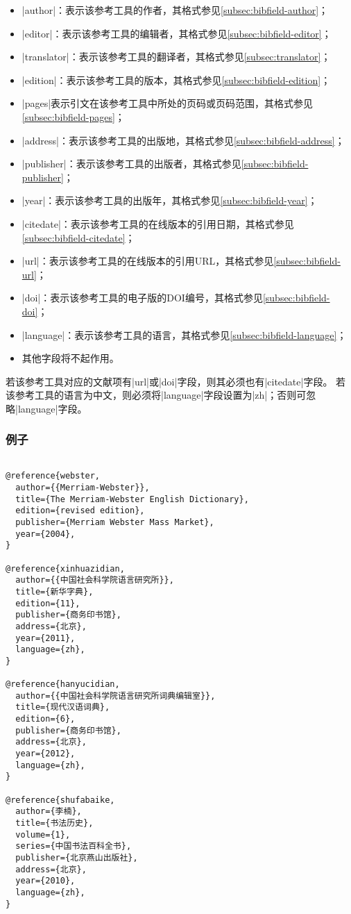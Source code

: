 \begin{itemize}
\item |author|：表示该参考工具的作者，其格式参见\ref{subsec:bibfield-author}；
\item |editor|：表示该参考工具的编辑者，其格式参见\ref{subsec:bibfield-editor}；
\item |translator|：表示该参考工具的翻译者，其格式参见\ref{subsec:translator}；
\item |edition|：表示该参考工具的版本，其格式参见\ref{subsec:bibfield-edition}；
\item |pages|表示引文在该参考工具中所处的页码或页码范围，其格式参见\ref{subsec:bibfield-pages}；
\item |address|：表示该参考工具的出版地，其格式参见\ref{subsec:bibfield-address}；
\item |publisher|：表示该参考工具的出版者，其格式参见\ref{subsec:bibfield-publisher}；
\item |year|：表示该参考工具的出版年，其格式参见\ref{subsec:bibfield-year}；
\item |citedate|：表示该参考工具的在线版本的引用日期，其格式参见\ref{subsec:bibfield-citedate}；
\item |url|：表示该参考工具的在线版本的引用URL，其格式参见\ref{subsec:bibfield-url}；
\item |doi|：表示该参考工具的电子版的DOI编号，其格式参见\ref{subsec:bibfield-doi}；
\item |language|：表示该参考工具的语言，其格式参见\ref{subsec:bibfield-language}；
\item 其他字段将不起作用。
\end{itemize}

\begin{note}
若该参考工具对应的文献项有|url|或|doi|字段，则其必须也有|citedate|字段。
若该参考工具的语言为中文，则必须将|language|字段设置为|zh|；否则可忽略|language|字段。
\end{note}

\subsubsection{例子}

\begin{verbatim}

@reference{webster,
  author={{Merriam-Webster}},  
  title={The Merriam-Webster English Dictionary},
  edition={revised edition},
  publisher={Merriam Webster Mass Market},
  year={2004},
}

@reference{xinhuazidian,
  author={{中国社会科学院语言研究所}},
  title={新华字典},
  edition={11},
  publisher={商务印书馆},
  address={北京},
  year={2011},
  language={zh},
}

@reference{hanyucidian,
  author={{中国社会科学院语言研究所词典编辑室}},
  title={现代汉语词典},
  edition={6},
  publisher={商务印书馆},
  address={北京},
  year={2012},
  language={zh},
}

@reference{shufabaike,
  author={李楠},
  title={书法历史},
  volume={1},
  series={中国书法百科全书},
  publisher={北京燕山出版社},
  address={北京},
  year={2010},
  language={zh},
}
\end{verbatim}
